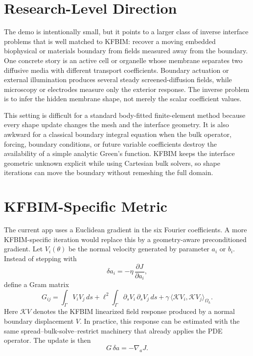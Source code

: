 \documentclass[11pt]{article}
\begin{document}
\section*{Research-Level Direction}

The demo is intentionally small, but it points to a larger class of inverse
interface problems that is well matched to KFBIM: recover a moving embedded
biophysical or materials boundary from fields measured away from the boundary.
One concrete story is an active cell or organelle whose membrane separates two
diffusive media with different transport coefficients.  Boundary actuation or
external illumination produces several steady screened-diffusion fields, while
microscopy or electrodes measure only the exterior response.  The inverse
problem is to infer the hidden membrane shape, not merely the scalar
coefficient values.

This setting is difficult for a standard body-fitted finite-element method
because every shape update changes the mesh and the interface geometry.  It is
also awkward for a classical boundary integral equation when the bulk operator,
forcing, boundary conditions, or future variable coefficients destroy the
availability of a simple analytic Green's function.  KFBIM keeps the interface
geometric unknown explicit while using Cartesian bulk solvers, so shape
iterations can move the boundary without remeshing the full domain.

\section*{KFBIM-Specific Metric}

The current app uses a Euclidean gradient in the six Fourier coefficients.
A more KFBIM-specific iteration would replace this by a geometry-aware
preconditioned gradient.  Let $V_i(\theta)$ be the normal velocity generated by
parameter $a_i$ or $b_i$.  Instead of stepping with
\[
    \delta a_i = -\eta\,\frac{\partial J}{\partial a_i},
\]
define a Gram matrix
\[
    G_{ij}
    =
    \int_\Gamma V_i V_j\,ds
    +
    \ell^2\int_\Gamma \partial_s V_i\,\partial_s V_j\,ds
    +
    \gamma\,
    \langle \mathcal{K}V_i,\mathcal{K}V_j\rangle_{\Omega_h}.
\]
Here $\mathcal{K}V$ denotes the KFBIM linearized field response produced by a
normal boundary displacement $V$.  In practice, this response can be estimated
with the same spread--bulk-solve--restrict machinery that already applies the
PDE operator.  The update is then
\[
    G\,\delta a = -\nabla_a J.
\]
\end{document}
